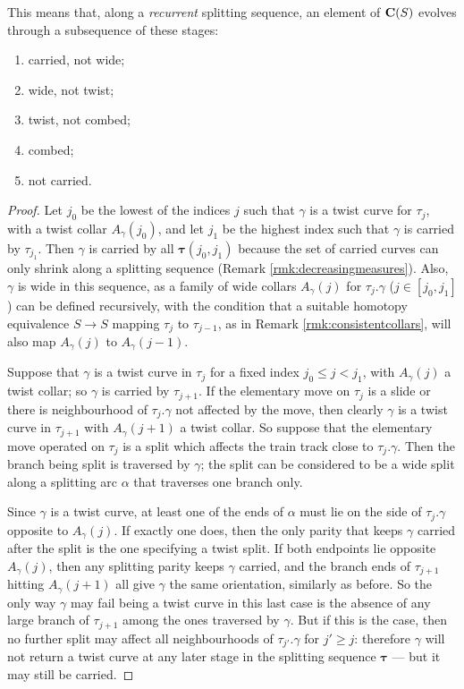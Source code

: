 This means that, along a \emph{recurrent} splitting sequence, an element of $\mathbf C(S)$ evolves through a subsequence of these stages:
\begin{enumerate}[label=\alph*.]
\item carried, not wide;
\item wide, not twist;
\item twist, not combed;
\item combed;
\item not carried.
\end{enumerate}

\begin{proof}
Let $j_0$ be the lowest of the indices $j$ such that $\gamma$ is a twist curve for $\tau_j$, with a twist collar $A_\gamma(j_0)$, and let $j_1$ be the highest index such that $\gamma$ is carried by $\tau_{j_1}$. Then $\gamma$ is carried by all $\bm\tau(j_0,j_1)$ because the set of carried curves can only shrink along a splitting sequence (Remark \ref{rmk:decreasingmeasures}). Also, $\gamma$ is wide in this sequence, as a family of wide collars $A_\gamma(j)$ for $\tau_j.\gamma$ ($j\in[j_0,j_1]$) can be defined recursively, with the condition that a suitable homotopy equivalence $S\rightarrow S$ mapping $\tau_j$ to $\tau_{j-1}$, as in Remark \ref{rmk:consistentcollars}, will also map $A_\gamma(j)$ to $A_\gamma(j-1)$.

Suppose that $\gamma$ is a twist curve in $\tau_j$ for a fixed index $j_0\leq j< j_1$, with $A_\gamma(j)$ a twist collar; so $\gamma$ is carried by $\tau_{j+1}$. If the elementary move on $\tau_j$ is a slide or there is neighbourhood of $\tau_j.\gamma$ not affected by the move, then clearly $\gamma$ is a twist curve in $\tau_{j+1}$ with $A_\gamma(j+1)$ a twist collar. So suppose that the elementary move operated on $\tau_j$ is a split which affects the train track close to $\tau_j.\gamma$. Then the branch being split is traversed by $\gamma$; the split can be considered to be a wide split along a splitting arc $\alpha$ that traverses one branch only.

Since $\gamma$ is a twist curve, at least one of the ends of $\alpha$ must lie on the side of $\tau_j.\gamma$ opposite to $A_\gamma(j)$. If exactly one does, then the only parity that keeps $\gamma$ carried after the split is the one specifying a twist split. If both endpoints lie opposite $A_\gamma(j)$, then any splitting parity keeps $\gamma$ carried, and the branch ends of $\tau_{j+1}$ hitting $A_\gamma(j+1)$ all give $\gamma$ the same orientation, similarly as before. So the only way $\gamma$ may fail being a twist curve in this last case is the absence of any large branch of $\tau_{j+1}$ among the ones traversed by $\gamma$. But if this is the case, then no further split may affect all neighbourhoods of $\tau_{j'}.\gamma$ for $j'\geq j$: therefore $\gamma$ will not return a twist curve at any later stage in the splitting sequence $\bm\tau$ --- but it may still be carried.


\end{proof}
